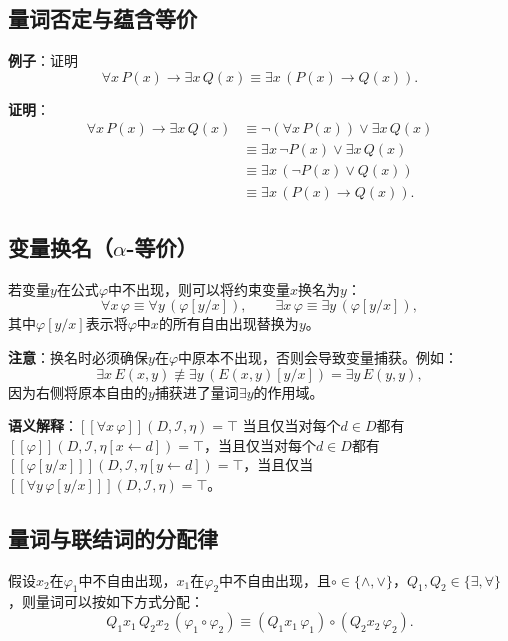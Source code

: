 \documentclass[UTF8,11pt,a4paper]{ctexbook}   %
\theoremstyle{definition}
\begin{document}
\subsection{量词否定与蕴含等价}

\textbf{例子}：证明
\[
\forall x\,P(x)\to\exists x\,Q(x)\equiv\exists x\,(P(x)\to Q(x)).
\]

\textbf{证明}：
\[
\begin{aligned}
\forall x\,P(x)\to\exists x\,Q(x)
&\equiv\neg(\forall x\,P(x))\lor\exists x\,Q(x)\\
&\equiv\exists x\,\neg P(x)\lor\exists x\,Q(x)\\
&\equiv\exists x\,(\neg P(x)\lor Q(x))\\
&\equiv\exists x\,(P(x)\to Q(x)).
\end{aligned}
\]

\subsection{\texorpdfstring{变量换名（$\alpha$-等价）}{变量换名（alpha-等价）}}

若变量$y$在公式$\varphi$中不出现，则可以将约束变量$x$换名为$y$：
\[
\forall x\,\varphi\equiv\forall y\,(\varphi[y/x]),\qquad
\exists x\,\varphi\equiv\exists y\,(\varphi[y/x]),
\]
其中$\varphi[y/x]$表示将$\varphi$中$x$的所有自由出现替换为$y$。

\textbf{注意}：换名时必须确保$y$在$\varphi$中原本不出现，否则会导致变量捕获。例如：
\[
\exists x\,E(x,y)\not\equiv\exists y\,(E(x,y)[y/x])=\exists y\,E(y,y),
\]
因为右侧将原本自由的$y$捕获进了量词$\exists y$的作用域。

\textbf{语义解释}：$[\![\forall x\,\varphi]\!](D,\mathcal{I},\eta)=\top$ 当且仅当对每个$d\in D$都有$[\![\varphi]\!](D,\mathcal{I},\eta[x\leftarrow d])=\top$，当且仅当对每个$d\in D$都有$[\![\varphi[y/x]]\!](D,\mathcal{I},\eta[y\leftarrow d])=\top$，当且仅当$[\![\forall y\,\varphi[y/x]]\!](D,\mathcal{I},\eta)=\top$。

\subsection{量词与联结词的分配律}

假设$x_2$在$\varphi_1$中不自由出现，$x_1$在$\varphi_2$中不自由出现，且$\circ\in\{\land,\lor\}$，$Q_1,Q_2\in\{\exists,\forall\}$，则量词可以按如下方式分配：
\[
Q_1 x_1\,Q_2 x_2\,(\varphi_1\circ\varphi_2)\equiv (Q_1 x_1\,\varphi_1)\circ(Q_2 x_2\,\varphi_2).
\]
\end{document}
